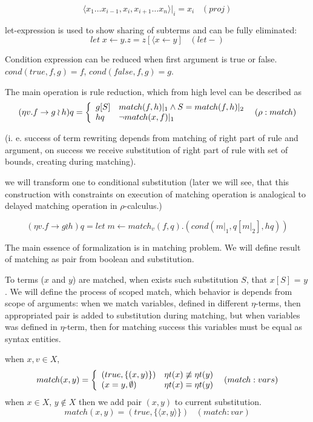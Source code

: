 \documentclass[10pt]{article}
\begin{document}
$${
 \langle x_{1} \dots x_{i-1}, x_{i}, x_{i+1} \dots x_{n} \rangle |_{i} = x_i
}\,\,\,\,\,{(proj)}$$

let-expression is used to show sharing of subterms and can be fully
eliminated:
$$
 let\;x\leftarrow y.z=z[\langle x\leftarrow y]
 \,\,\,\,\,{(let-)}
$$

Condition expression can be reduced when first argument is true or false.
  $cond(true,f,g) = f$,  $cond(false,f,g)=g$.


The main operation is rule reduction, which from high level can be described
 as
$$
{
  ({\eta v. f\to g \wr h}) q = \left\{
    \begin{array}{l l}
      g[S]  &  match(f,h)|_{1} \land S=match(f,h)|_{2}  \\
      h q  & \neg match(x,f)|_{1} \\       
    \end{array}
    \right.   
}\,\,\,\,{(\rho:match)}  
$$

  (i. e. success of term rewriting depends from matching of right part of rule and argument,
  on success we receive substitution of right part of rule with set of bounds, creating 
  during matching).

  we will transform one to conditional substitution (later we will see, that this 
  construction with constraints on execution of matching operation is analogical to 
  delayed matching operation in $\rho$-calculus.)

  $$
   (\eta v.f\to g \wr h) q  =  let\;m\leftarrow match_v(f,q) . (cond(m|_{1},q[m|_2],h q) )
  $$

  The main essence of formalization is in matching problem. We will define result
  of matching as pair from boolean and substitution.
  
  To terms ($x$ and $y$) are matched, when exists such substitution $S$, 
  that $x[S]$ = $y$. We will define the process of scoped match, which 
  behavior is depends from scope of arguments: when we match variables,
  defined in different $\eta$-terms, then appropriated pair is 
  added to substitution during matching, but when variables was defined in 
  $\eta$-term, then for matching success this variables must  be equal as 
  syntax entities.
  
   when $x,v\in X$, 
    $$
    {
    match(x,y) = \left\{
     \begin{array}{l l}
        (true,\{(x,y)\}) &  \eta t(x) \not\equiv \eta t(y) \\
        (x=y,\emptyset) &   \eta t(x) \equiv \eta t(y) \\
     \end{array}
    \right.
    }\,\,\,\,{(match:vars)}
    $$ 
    when $x \in X$, $y \not \in X$ then we add pair $(x,y)$ to current substitution.
    $$
    {
     match(x,y) = (true, \{\langle x,y\rangle\}) 
    }\,\,\,\,\,{(match:var)}  
    $$    
    
\end{document}
